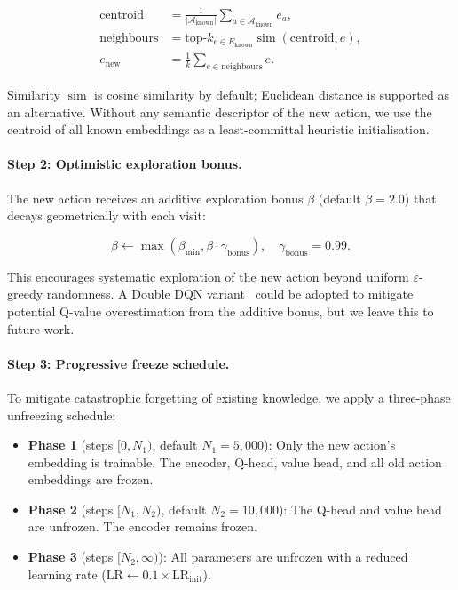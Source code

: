 \documentclass{article}
\begin{document}
\begin{align}
\text{centroid} &= \frac{1}{|\mathcal{A}_\text{known}|} \sum_{a \in \mathcal{A}_\text{known}} e_a, \label{eq:centroid} \\
\text{neighbours} &= \text{top-}k_{e \in E_\text{known}} \operatorname{sim}(\text{centroid}, e), \label{eq:knn} \\
e_\text{new} &= \frac{1}{k} \sum_{e \in \text{neighbours}} e. \label{eq:new_emb}
\end{align}

Similarity $\operatorname{sim}$ is cosine similarity by default; Euclidean distance is supported as an alternative. Without any semantic descriptor of the new action, we use the centroid of all known embeddings as a least-committal heuristic initialisation.

\paragraph{Step 2: Optimistic exploration bonus.} The new action receives an additive exploration bonus $\beta$ (default $\beta=2.0$) that decays geometrically with each visit:

\begin{equation}
\beta \leftarrow \max(\beta_\text{min}, \beta \cdot \gamma_\text{bonus}), \quad \gamma_\text{bonus}=0.99.
\end{equation}

This encourages systematic exploration of the new action beyond uniform $\varepsilon$-greedy randomness. A Double DQN variant~\cite{vanhasselt2016double} could be adopted to mitigate potential Q-value overestimation from the additive bonus, but we leave this to future work.

\paragraph{Step 3: Progressive freeze schedule.} To mitigate catastrophic forgetting of existing knowledge, we apply a three-phase unfreezing schedule:

\begin{itemize}
  \item \textbf{Phase 1} (steps $[0, N_1)$, default $N_1=5{,}000$): Only the new action's embedding is trainable. The encoder, Q-head, value head, and all old action embeddings are frozen.
  \item \textbf{Phase 2} (steps $[N_1, N_2)$, default $N_2=10{,}000$): The Q-head and value head are unfrozen. The encoder remains frozen.
  \item \textbf{Phase 3} (steps $[N_2, \infty)$): All parameters are unfrozen with a reduced learning rate ($\text{LR} \leftarrow 0.1 \times \text{LR}_\text{init}$).
\end{itemize}
\end{document}

